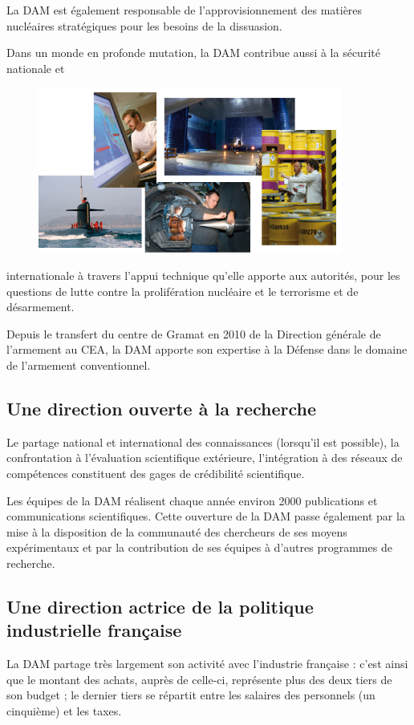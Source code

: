 \documentclass[12pt,a4paper,twoside]{article}
\begin{document}
    La DAM est également responsable de l'approvisionnement des matières nucléaires
    straté\-giques pour les besoins de la dissuasion.

    Dans un monde en profonde mutation, la DAM contribue aussi à la sécurité
    nationale et
    \begin{figure}
        \includegraphics[width=10cm]{ressources/images/dam/5_thumbnails.jpg}
    \end{figure}
    internationale à travers l'appui technique qu'elle apporte aux autorités, pour
    les questions de lutte contre la prolifération nucléaire et le terrorisme et de
    désarmement.

    Depuis le transfert du centre de Gramat en 2010 de la Direction générale de
    l'armement au CEA, la DAM apporte son expertise à la Défense dans le domaine de
    l'armement conventionnel.

    \subsection*{Une direction ouverte à la recherche}
    Le partage national et international des connaissances (lorsqu'il est possible),
    la confrontation à l'évaluation scientifique extérieure, l'intégration à des
    réseaux de compétences constituent des gages de crédibilité scientifique.

    Les équipes de la DAM réalisent chaque année environ 2000 publications et
    communications scientifiques. Cette ouverture de la DAM passe également par la
    mise à la disposition de la communauté des chercheurs de ses moyens
    expérimentaux et par la contribution de ses équipes à d'autres programmes de
    recherche.

    \subsection*{Une direction actrice de la politique industrielle française}
    La DAM partage très largement son activité avec l'industrie française : c'est
    ainsi que le montant des achats, auprès de celle-ci, représente plus des deux
    tiers de son budget ; le dernier tiers se répartit entre les salaires des
    personnels (un cinquième) et les taxes.
\end{document}
